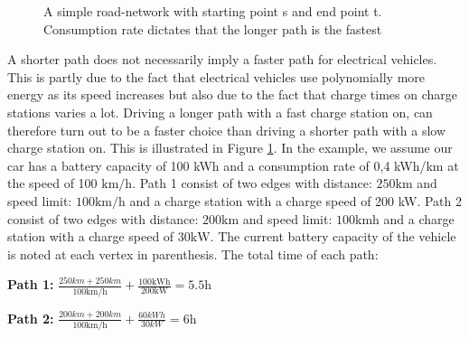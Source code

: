 \begin{figure}
\label{fig:simpleroad-network}
\caption{A simple road-network with starting point s and end point t. Consumption rate dictates that the longer path is the fastest}
\end{figure}

A shorter path does not necessarily imply a faster path for electrical vehicles. This is partly due to the fact that electrical vehicles use polynomially more energy as its speed increases but also due to the fact that charge times on charge stations varies a lot. 
Driving a longer path with a fast charge station on, can therefore turn out to be a faster choice than driving a shorter path with a slow charge station on. This is illustrated in Figure \ref{fig:simpleroad-network}. In the example, we assume our car has a battery capacity of 100 kWh and a consumption rate of 0,4 kWh/km at the speed of 100 $\si{\km\per\hour}$. Path 1 consist of two edges with distance: $ 250 \si{\km}$ and speed limit: $100 \si{\km\per\hour}$
and a charge station with a charge speed of 200 kW. Path 2 consist of two edges with
distance: $200 \si{\km}$ and speed limit: $100 \si{\km\hour}$ and a charge station with a charge speed of $30\si{\kW}$. The current battery capacity of the vehicle is noted at each vertex in parenthesis. The total time of each path:
				
\textbf{Path 1:} $\frac{250\si{km} + 250\si{km}}{100\si{\km\per\hour}} + \frac{100\si{\kWh}}{200\si{\kW}} = 5.5\si{\hour}$

\textbf{Path 2:} $\frac{200\si{km} + 200\si{km}}{100 \si{\km\per\hour}} + \frac{60 kWh }{ 30 kW} = 6\si{\hour}$

